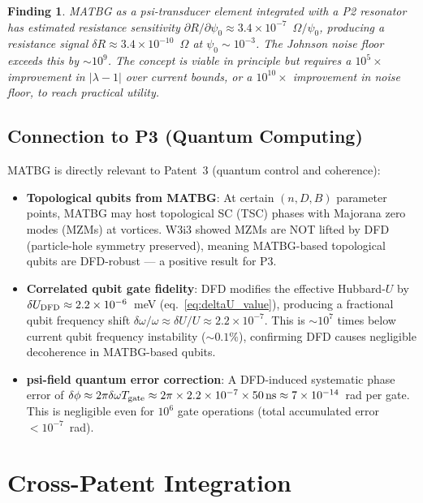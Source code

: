 \documentclass[11pt]{article}
\newtheorem{finding}{Finding}
\newcommand{\ee}[1]{\times 10^{#1}}
\begin{document}
\begin{finding}
  \label{find:transducer}
  MATBG as a psi-transducer element integrated with a P2 resonator
  has estimated resistance sensitivity $\partial R/\partial\psi_0 \approx
  3.4\ee{-7}$~$\Omega/\psi_0$, producing a resistance signal
  $\delta R \approx 3.4\ee{-10}$~$\Omega$ at $\psi_0 \sim 10^{-3}$.
  The Johnson noise floor exceeds this by $\sim 10^9$. The concept is
  viable in principle but requires a $10^5\times$ improvement in $|\lambda-1|$
  over current bounds, or a $10^{10}\times$ improvement in noise floor,
  to reach practical utility.
\end{finding}

\subsection{Connection to P3 (Quantum Computing)}

MATBG is directly relevant to Patent~3 (quantum control and coherence):
\begin{itemize}
  \item \textbf{Topological qubits from MATBG}: At certain $(n, D, B)$
    parameter points, MATBG may host topological SC (TSC) phases with
    Majorana zero modes (MZMs) at vortices. W3i3 showed MZMs are
    NOT lifted by DFD (particle-hole symmetry preserved), meaning
    MATBG-based topological qubits are DFD-robust --- a positive result
    for P3.
  \item \textbf{Correlated qubit gate fidelity}: DFD modifies the
    effective Hubbard-$U$ by $\delta U_{\rm DFD} \approx 2.2\ee{-6}$~meV
    (eq.~\ref{eq:deltaU_value}), producing a fractional qubit frequency
    shift $\delta\omega/\omega \approx \delta U/U \approx 2.2\ee{-7}$.
    This is $\sim 10^7$ times below current qubit frequency instability
    ($\sim 0.1\%$), confirming DFD causes negligible decoherence in
    MATBG-based qubits.
  \item \textbf{psi-field quantum error correction}: A DFD-induced
    systematic phase error of $\delta\phi \approx 2\pi \delta\omega T_{\rm gate}
    \approx 2\pi \times 2.2\ee{-7} \times 50\,\text{ns} \approx 7\ee{-14}$~rad
    per gate. This is negligible even for $10^6$ gate operations (total
    accumulated error $< 10^{-7}$~rad).
\end{itemize}

\section{Cross-Patent Integration}
\label{sec:crosspatent}
\end{document}
